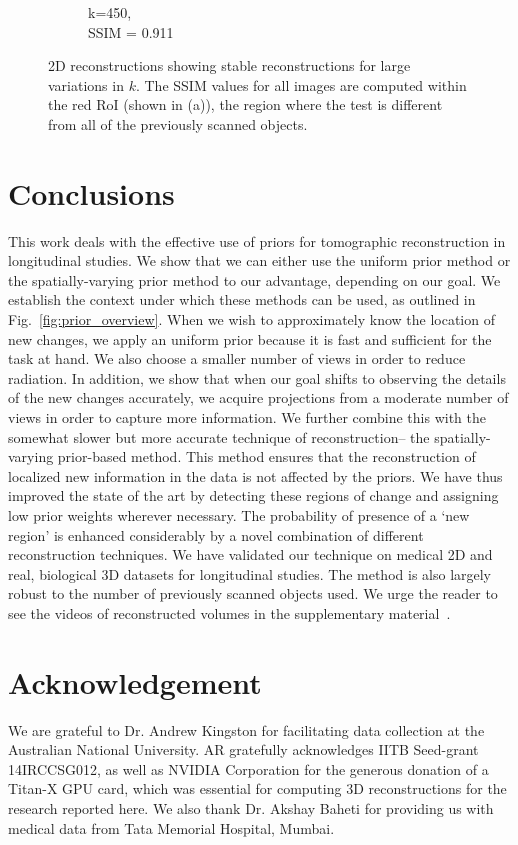 \documentclass[journal]{IEEEtran}
\begin{document}
\begin{figure}[h]
\begin{subfigure}[b]{0.24\linewidth}
        \caption{k=450,\\ SSIM = 0.911}
     \end{subfigure}
    \caption{2D reconstructions showing stable reconstructions for large variations in $k$. The SSIM values for all images are computed within the red RoI (shown in (a)), the region where the test is different from all of the previously scanned objects.}
\label{fig:reconstructions_as_k_varies}
\end{figure}


\section{Conclusions}
\label{sec:conclusions}
This work deals with the effective use of priors for tomographic
reconstruction in longitudinal studies. We show that we can either use
the uniform prior method or the spatially-varying prior method
to our advantage, depending on our goal. We establish the context
under which these methods can be used, as outlined in
Fig.~\ref{fig:prior_overview}. When we wish to approximately know the
location of new changes, we apply an uniform prior because it is fast
and sufficient for the task at hand. We also choose a smaller number
of views in order to reduce radiation. In addition, we show that when
our goal shifts to observing the details of the new changes
accurately, we acquire projections from a moderate number of views in
order to capture more information. We further combine this with the
somewhat slower but more accurate technique of reconstruction-- the
spatially-varying prior-based method. This method ensures that the
reconstruction of localized new information in the data is not
affected by the priors. We have thus improved the state of the art by
detecting these regions of change and assigning low prior weights
wherever necessary. The probability of presence of a `new region' is
enhanced considerably by a novel combination of different
reconstruction techniques.  We have validated our technique on medical
2D and real, biological 3D datasets for longitudinal studies. The
method is also largely robust to the number of previously scanned
objects used. We urge the reader to see the videos of reconstructed
volumes in the supplementary material~\cite{supp_paper}.

\section{Acknowledgement}
We are grateful to Dr. Andrew Kingston for facilitating data
collection at the Australian National University. AR gratefully
acknowledges IITB Seed-grant 14IRCCSG012, as well as NVIDIA
Corporation for the generous donation of a Titan-X GPU card, which was
essential for computing 3D reconstructions for the research reported
here. We also thank Dr. Akshay Baheti for providing us with medical
data from Tata Memorial Hospital, Mumbai.
{%
}
\end{document}
